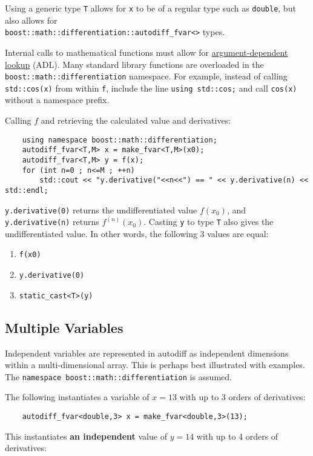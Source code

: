 \documentclass{article}
\begin{document}
Using a generic type {\tt T} allows for {\tt x} to be of a regular type such as {\tt double}, but also allows for\\
{\tt boost::math::differentiation::autodiff\_fvar<>} types.

Internal calls to mathematical functions must allow for
\href{https://en.cppreference.com/w/cpp/language/adl}{argument-dependent lookup} (ADL). Many standard library functions
are overloaded in the {\tt boost::math::differentiation} namespace. For example, instead of calling {\tt std::cos(x)}
from within {\tt f}, include the line {\tt using std::cos;} and call {\tt cos(x)} without a namespace prefix.

Calling $f$ and retrieving the calculated value and derivatives:

\begin{verbatim}
    using namespace boost::math::differentiation;
    autodiff_fvar<T,M> x = make_fvar<T,M>(x0);
    autodiff_fvar<T,M> y = f(x);
    for (int n=0 ; n<=M ; ++n)
        std::cout << "y.derivative("<<n<<") == " << y.derivative(n) << std::endl;
\end{verbatim}

{\tt y.derivative(0)} returns the undifferentiated value $f(x_0)$, and {\tt y.derivative(n)} returns $f^{(n)}(x_0)$.
Casting {\tt y} to type {\tt T} also gives the undifferentiated value. In other words, the following 3 values
are equal:
\begin{enumerate}
\item {\tt f(x0)}
\item {\tt y.derivative(0)}
\item {\tt static\_cast<T>(y)}
\end{enumerate}

\subsection{Multiple Variables}

Independent variables are represented in autodiff as independent dimensions within a multi-dimensional array.
This is perhaps best illustrated with examples. The {\tt namespace boost::math::differentiation} is assumed.

The following instantiates a variable of $x=13$ with up to 3 orders of derivatives:

\begin{verbatim}
    autodiff_fvar<double,3> x = make_fvar<double,3>(13);
\end{verbatim}
This instantiates {\bf an independent} value of $y=14$ with up to 4 orders of derivatives:
\end{document}
